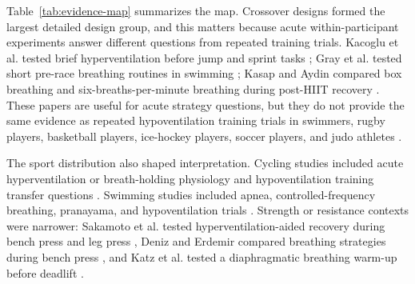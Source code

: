 \documentclass[12pt,a4paper]{article}
\begin{document}
Table~\ref{tab:evidence-map} summarizes the map. Crossover designs formed the largest detailed design group, and this matters because acute within-participant experiments answer different questions from repeated training trials. Kacoglu et al. tested brief hyperventilation before jump and sprint tasks \parencite{kacoglu_acute_2017}; Gray et al. tested short pre-race breathing routines in swimming \parencite{gray_pre-race_2018}; Kasap and Aydin compared box breathing and six-breaths-per-minute breathing during post-HIIT recovery \parencite{kasap_m_and_aydin_gr_box_2025}. These papers are useful for acute strategy questions, but they do not provide the same evidence as repeated hypoventilation training trials in swimmers, rugby players, basketball players, ice-hockey players, soccer players, and judo athletes \parencite{woorons_hypoventilation_2016,trincat_repeated-sprint_2017,fornasier-santos_repeated-sprint_2018,lapointe_impact_2020,brocherie_effects_2023,ait_ali_braham_m_and_ouchen_y_and_woorons_x_effects_2024,lorinczi_additional_2025}.

The sport distribution also shaped interpretation. Cycling studies included acute hyperventilation or breath-holding physiology \parencite{fujii_effect_2015,dobashi_voluntary_2021,grossman_kj_and_lim_dj_and_murias_jm_and_belfry_gr_effect_2021} and hypoventilation training transfer questions \parencite{woorons_physiological_2019,woorons_transferable_2020}. Swimming studies included apnea, controlled-frequency breathing, pranayama, and hypoventilation trials \parencite{guimard_acute_2014,stavrou_v_and_toubekis_ag_and_karetsi_e_changes_2015,burtch_controlled_2017,hakked_cs_and_balakrishnan_r_and_krishnamurthy_mn_yogic_2017,trincat_repeated-sprint_2017,robertson_effects_2020}. Strength or resistance contexts were narrower: Sakamoto et al. tested hyperventilation-aided recovery during bench press and leg press \parencite{sakamoto_hyperventilation-aided_2020}, Deniz and Erdemir compared breathing strategies during bench press \parencite{deniz_ie_and_erdemir_i_influence_2025}, and Katz et al. tested a diaphragmatic breathing warm-up before deadlift \parencite{katz_ns_and_rossow_lm_and_fahs_ca_acute_2026}.
\end{document}
